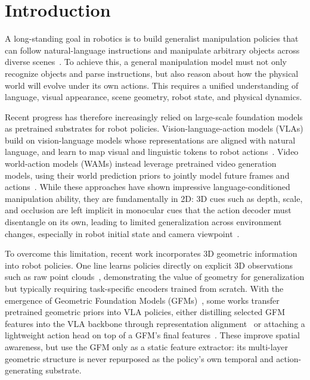 \section{Introduction}
\label{sec:intro}
A long-standing goal in robotics is to build generalist manipulation policies that can follow natural-language instructions and manipulate arbitrary objects across diverse scenes~\citep{kim2024openvla, openvla_oft, kim2026cosmos, black2024pi_0}. To achieve this, a general manipulation model must not only recognize objects and parse instructions, but also reason about how the physical world will evolve under its own actions. This requires a unified understanding of language, visual appearance, scene geometry, robot state, and physical dynamics. 

Recent progress has therefore increasingly relied on large-scale foundation models as pretrained substrates for robot policies. Vision-language-action models (VLAs) build on vision-language models whose representations are aligned with natural language, and learn to map visual and linguistic tokens to robot actions~\cite{zitkovich2023rt,kim2024openvla,openvla_oft,black2024pi_0,pi05,pi0_fast}. Video world-action models (WAMs) instead leverage pretrained video generation models, using their world prediction priors to jointly model future frames and actions~\cite{kim2026cosmos,pai2025mimic}. While these approaches have shown impressive language-conditioned manipulation ability, they are fundamentally in 2D: 3D cues such as depth, scale, and occlusion are left implicit in monocular cues that the action decoder must disentangle on its own, leading to limited generalization across environment changes, especially in robot initial state and camera viewpoint~\cite{fei2025libero}. 

To overcome this limitation, recent work incorporates 3D geometric information into robot policies. One line learns policies directly on explicit 3D observations such as raw point clouds~\citep{ze20243d,huang2026pointworld}, demonstrating the value of geometry for generalization but typically requiring task-specific encoders trained from scratch. With the emergence of Geometric Foundation Models (GFMs)~\cite{lin2025depth,wang2025vggt,wang2026vggt}, some works transfer pretrained geometric priors into VLA policies, either distilling selected GFM features into the VLA backbone through representation alignment~\citep{yu2024representation,li2025spatial,sun2026rocket} or attaching a lightweight action head on top of a GFM's final features~\citep{qian2025gp3,ge2025vggt}. These improve spatial awareness, but use the GFM only as a static feature extractor: its multi-layer geometric structure is never repurposed as the policy's own temporal and action-generating substrate.  

